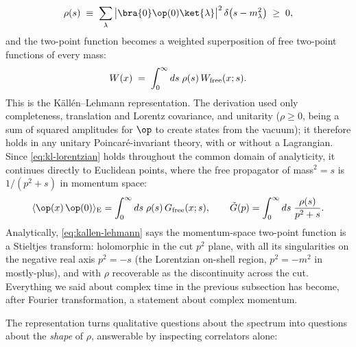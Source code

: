 \begin{equation}
\rho(s) \;\equiv\; \sum_\lambda \big|\bra{0}\op(0)\ket{\lambda}\big|^2\,
\delta\big(s - m_\lambda^2\big) \;\ge\; 0,
\label{eq:spectral-density}
\end{equation}
and the two-point function becomes a weighted superposition of free
two-point functions of every mass:
\begin{equation}
W(x) \;=\; \int_0^\infty ds\; \rho(s)\, W_{\rm free}(x; s).
\label{eq:kl-lorentzian}
\end{equation}
This is the K\"all\'en--Lehmann representation. The derivation used only
completeness, translation and Lorentz covariance, and unitarity ($\rho \ge
0$, being a sum of squared amplitudes for $\op$ to create states from the
vacuum); it therefore holds in any unitary Poincar\'e-invariant theory, with
or without a Lagrangian. Since \eqref{eq:kl-lorentzian} holds throughout the
common domain of analyticity, it continues directly to Euclidean points,
where the free propagator of mass$^2 = s$ is $1/(p^2 + s)$ in momentum
space:
\begin{equation}
\langle \op(x)\, \op(0) \rangle_{\rm E}
= \int_0^\infty ds \; \rho(s)\, G_{\rm free}(x; s),
\qquad
\tilde G(p) = \int_0^\infty ds\; \frac{\rho(s)}{p^2 + s}.
\label{eq:kallen-lehmann}
\end{equation}
Analytically, \eqref{eq:kallen-lehmann}
says the momentum-space two-point function is a Stieltjes transform: holomorphic
in the cut $p^2$ plane, with all its singularities on the negative real axis
$p^2 = -s$ (the Lorentzian on-shell region, $p^2 = -m^2$ in mostly-plus), and
with $\rho$ recoverable as the discontinuity across the cut. Everything we said
about complex time in the previous subsection has become, after Fourier
transformation, a statement about complex momentum.

The representation turns qualitative questions about the spectrum into
questions about the \emph{shape} of $\rho$, answerable by inspecting
correlators alone:

